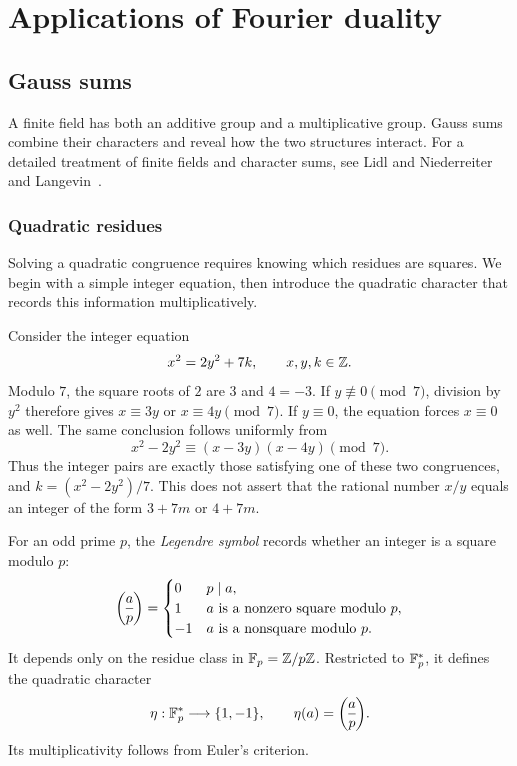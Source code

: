 \chapter{Applications of Fourier duality}
\label{chap-applications-trans-fourier-grpe-finite}

\section{Gauss sums}
\label{sect1-are-gauss}
A finite field has both an additive group and a multiplicative group.
Gauss sums combine their characters and reveal how the two structures
interact. For a detailed treatment of finite fields and character sums, see
Lidl and Niederreiter~\cite{lidl} and Langevin~\cite{langevin}.

\subsection{Quadratic residues}

Solving a quadratic congruence requires knowing which residues are squares.
We begin with a simple integer equation, then introduce the quadratic
character that records this information multiplicatively.

Consider the integer equation
\begin{equation}
\label{eq-example-quadratic-equation}
 x^2=2y^2+7k,\qquad x,y,k\in\mathbb{Z}.
\end{equation}
Modulo $7$, the square roots of $2$ are $3$ and $4=-3$.
If $y\not\equiv0\pmod7$, division by $y^2$ therefore gives
$x\equiv3y$ or $x\equiv4y\pmod7$. If $y\equiv0$, the equation forces
$x\equiv0$ as well. The same conclusion follows uniformly from
\[
 x^2-2y^2\equiv(x-3y)(x-4y)\pmod7.
\]
Thus the integer pairs are exactly those satisfying one of these two
congruences, and $k=(x^2-2y^2)/7$. This does not assert that the rational
number $x/y$ equals an integer of the form $3+7m$ or $4+7m$.

For an odd prime $p$, the \emph{Legendre symbol} records whether an integer
is a square modulo $p$:
\label{notation-25}
\[
 \legsymb ap=
 \begin{cases}
 0&p\mid a,\\
 1&a\text{ is a nonzero square modulo }p,\\
 -1&a\text{ is a nonsquare modulo }p.
 \end{cases}
\]
It depends only on the residue class in $\mathbb{F}_p=\mathbb{Z}/p\mathbb{Z}$.
Restricted to $\mathbb{F}_p^*$, it defines the quadratic character
\begin{equation}
\label{eq-defn-cartactere-eta}
 \eta:\FF_p^*\longrightarrow\{1,-1\},\qquad
 \eta(a)=\legsymb ap.
\end{equation}
Its multiplicativity follows from Euler's criterion.

